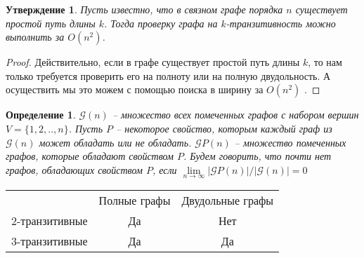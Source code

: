 \documentclass[a4paper,12pt]{article}
\theoremstyle{plain}
\newtheorem{statement}{Утверждение}
\theoremstyle{definition}
\newtheorem{definition}{Определение}
\begin{document}
	
	\begin{statement} \label{l13}
		{\it Пусть известно, что в связном графе порядка $n$ существует простой путь длины $k$. Тогда проверку графа на $k$-транзитивность можно выполнить за $O(n^2)$.
   }
	\end{statement}  
	\begin{proof}
	Действительно, если в графе существует простой путь длины $k$, то нам только требуется проверить его на полноту или на полную двудольность. А осуществить мы это можем с помощью поиска в ширину за $O(n^2)$  \cite{11}. 
	
	\end{proof}
	
	
	\begin{definition}
		{\it $\mathcal{G}(n)$ -- множество всех помеченных графов с набором вершин $V = \{1,2,..,n\}$. Пусть $P$ -- некоторое свойство, которым каждый граф из $\mathcal{G}(n)$  может обладать или не обладать. $\mathcal{G}P(n)$ -- множество помеченных графов, которые обладают свойством $P$. Будем говорить, что почти нет графов, обладающих свойством $P$, если $\lim\limits_{n\to \infty } |\mathcal{G}P(n)|/ |\mathcal{G}(n)| =0$ }
	\end{definition} 
	
	
	\begin{center}
	    \begin{tabular}{ c|c|c| }
\multicolumn{1}{r}{}
 &  \multicolumn{1}{c}{Полные графы}
 & \multicolumn{1}{c}{Двудольные графы} \\
\cline{2-3}
2-транзитивные & Да & Нет \\
\cline{2-3}
3-транзитивные & Да & Да \\
\cline{2-3}
\end{tabular}
	\end{center}
	
\end{document}
